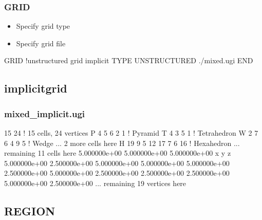 \documentclass{beamer}
\newcommand\gehcomment[1]{{{\color{orange} #1}}}
\newcommand\bluecomment[1]{{{\color{blue} #1}}}
\begin{document}
\begin{frame}[fragile]\frametitle{GRID}

\begin{itemize}
  \item Specify grid type
  \item Specify grid file
\end{itemize}


\begin{semiverbatim}

GRID \bluecomment{!unstructured grid implicit}
  TYPE UNSTRUCTURED ./mixed.ugi
END

\end{semiverbatim}

\end{frame}

\subsection{implicitgrid}

\begin{frame}[fragile]\frametitle{mixed\_implicit.ugi}

\begin{semiverbatim}
15 24 \bluecomment{! 15 cells, 24 vertices}
P 4 5 6 2 1           \bluecomment{! Pyramid}
T 4 3 5 1             \bluecomment{! Tetrahedron}
W 2 7 6 4 9 5         \bluecomment{! Wedge}
... \gehcomment{2 more cells here}
H 19 9 5 12 17 7 6 16 \bluecomment{! Hexahedron}
... \gehcomment{remaining 11 cells here}
5.000000e+00 5.000000e+00 5.000000e+00 \bluecomment{x y z}
5.000000e+00 2.500000e+00 5.000000e+00
5.000000e+00 5.000000e+00 2.500000e+00
5.000000e+00 2.500000e+00 2.500000e+00
2.500000e+00 5.000000e+00 2.500000e+00
... \gehcomment{remaining 19 vertices here}
\end{semiverbatim}

\end{frame}
\subsection{REGION}
\end{document}
